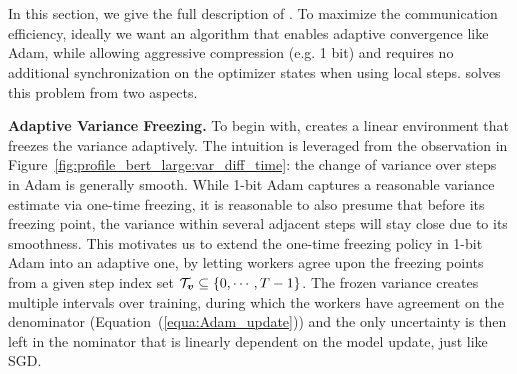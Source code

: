 \section{\myalgo}
\label{sec:algorithm}
In this section, we give the full description of {\myalgo}. To maximize the communication efficiency, ideally we want an algorithm that enables adaptive convergence like Adam, while allowing aggressive compression (e.g. 1 bit) and requires no additional synchronization on the optimizer states when using local steps. {\myalgo} solves this problem from two aspects.

\textbf{Adaptive Variance Freezing.}
To begin with,
{\myalgo} creates a linear environment that freezes the variance adaptively. The intuition is leveraged from the observation in Figure~\ref{fig:profile_bert_large:var_diff_time}: the change of variance over steps in Adam is generally smooth. While 1-bit Adam captures a reasonable variance estimate via one-time freezing, it is reasonable to also presume that before its freezing point, the variance within several adjacent steps will stay close due to its smoothness.
This motivates us to extend the one-time freezing policy in 1-bit Adam into an adaptive one, by letting workers agree upon the freezing points from a given step index set $\mathcal{T}_{\boldsymbol{v}}\subseteq\{0, \cdots, T-1\}$.
The frozen variance creates multiple intervals over training, during which the workers have agreement on the denominator (Equation~(\ref{equa:Adam_update})) and the only uncertainty is then left in the nominator that is linearly dependent on the model update, just like SGD.



